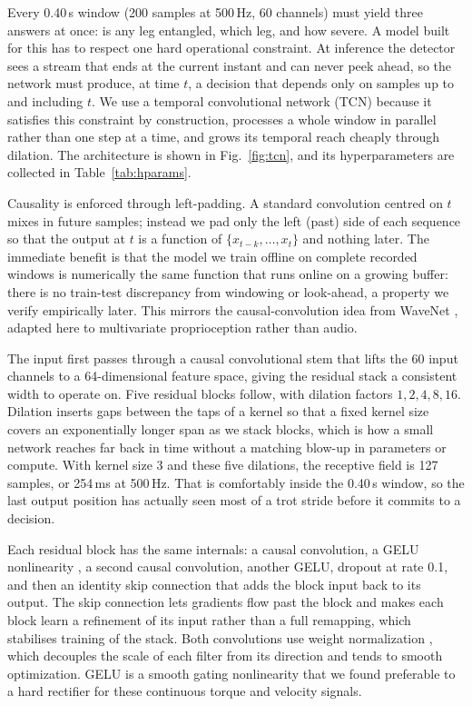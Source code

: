 \documentclass[conference]{IEEEtran}
\begin{document}
Every 0.40\,s window (200 samples at 500\,Hz, 60 channels) must yield three answers at once: is any leg entangled, which leg, and how severe. A model built for this has to respect one hard operational constraint. At inference the detector sees a stream that ends at the current instant and can never peek ahead, so the network must produce, at time $t$, a decision that depends only on samples up to and including $t$. We use a temporal convolutional network (TCN) \cite{bai2018tcn} because it satisfies this constraint by construction, processes a whole window in parallel rather than one step at a time, and grows its temporal reach cheaply through dilation. The architecture is shown in Fig.~\ref{fig:tcn}, and its hyperparameters are collected in Table~\ref{tab:hparams}.

Causality is enforced through left-padding. A standard convolution centred on $t$ mixes in future samples; instead we pad only the left (past) side of each sequence so that the output at $t$ is a function of $\{x_{t-k},\dots,x_t\}$ and nothing later. The immediate benefit is that the model we train offline on complete recorded windows is numerically the same function that runs online on a growing buffer: there is no train-test discrepancy from windowing or look-ahead, a property we verify empirically later. This mirrors the causal-convolution idea from WaveNet \cite{oord2016wavenet}, adapted here to multivariate proprioception rather than audio.

The input first passes through a causal convolutional stem that lifts the 60 input channels to a 64-dimensional feature space, giving the residual stack a consistent width to operate on. Five residual blocks follow, with dilation factors $1,2,4,8,16$. Dilation inserts gaps between the taps of a kernel so that a fixed kernel size covers an exponentially longer span as we stack blocks, which is how a small network reaches far back in time without a matching blow-up in parameters or compute. With kernel size 3 and these five dilations, the receptive field is 127 samples, or 254\,ms at 500\,Hz. That is comfortably inside the 0.40\,s window, so the last output position has actually seen most of a trot stride before it commits to a decision.

Each residual block has the same internals: a causal convolution, a GELU nonlinearity \cite{hendrycks2016gelu}, a second causal convolution, another GELU, dropout at rate 0.1, and then an identity skip connection that adds the block input back to its output. The skip connection lets gradients flow past the block and makes each block learn a refinement of its input rather than a full remapping, which stabilises training of the stack. Both convolutions use weight normalization \cite{salimans2016weightnorm}, which decouples the scale of each filter from its direction and tends to smooth optimization. GELU is a smooth gating nonlinearity that we found preferable to a hard rectifier for these continuous torque and velocity signals.
\end{document}
